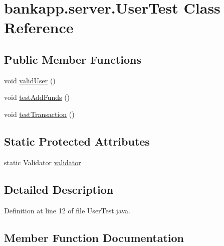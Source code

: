 \hypertarget{classbankapp_1_1server_1_1_user_test}{}\section{bankapp.\+server.\+User\+Test Class Reference}
\label{classbankapp_1_1server_1_1_user_test}
\subsection*{Public Member Functions}
\begin{DoxyCompactItemize}
\item 
void \hyperlink{classbankapp_1_1server_1_1_user_test_a81e734600780565479bc7e3e9d58488f}{valid\+User} ()
\item 
void \hyperlink{classbankapp_1_1server_1_1_user_test_aee87b14528a0013dd6fd5ca51c7ec54d}{test\+Add\+Funds} ()
\item 
void \hyperlink{classbankapp_1_1server_1_1_user_test_a5da66e25464ee57cb9e9246c9a026966}{test\+Transaction} ()
\end{DoxyCompactItemize}
\subsection*{Static Protected Attributes}
\begin{DoxyCompactItemize}
\item 
static Validator \hyperlink{classbankapp_1_1server_1_1_user_test_a2cf04df9520daf97f986e1e5d16dcb29}{validator}
\end{DoxyCompactItemize}


\subsection{Detailed Description}


Definition at line 12 of file User\+Test.\+java.



\subsection{Member Function Documentation}
\mbox{\label{classbankapp_1_1server_1_1_user_test_aee87b14528a0013dd6fd5ca51c7ec54d}} 
